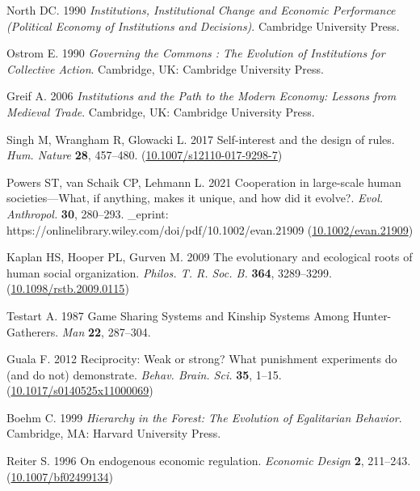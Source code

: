 \documentclass{rstb}
\begin{document}
\begin{thebibliography}{99}

North DC. 1990 {\em Institutions, Institutional Change and Economic Performance
  (Political Economy of Institutions and Decisions)}.
Cambridge University Press.

Ostrom E. 1990 {\em Governing the Commons : {The} Evolution of Institutions for
  Collective Action}.
Cambridge, UK: Cambridge University Press.

Greif A. 2006 {\em Institutions and the Path to the Modern Economy: Lessons
  from Medieval Trade}.
Cambridge, UK: Cambridge University Press.

Singh M, Wrangham R, Glowacki L. 2017  Self-interest and the design of rules.
  {\em Hum. Nature} \textbf{28}, 457--480.
(\href{http://dx.doi.org/10.1007/s12110-017-9298-7}{10.1007/s12110-017-9298-7})

Powers ST, van Schaik CP, Lehmann L. 2021  Cooperation in large-scale human
  societies—{What}, if anything, makes it unique, and how did it evolve?.
  {\em Evol. Anthropol.} \textbf{30},
  280--293.
\_eprint: https://onlinelibrary.wiley.com/doi/pdf/10.1002/evan.21909
  (\href{http://dx.doi.org/10.1002/evan.21909}{10.1002/evan.21909})

Kaplan HS, Hooper PL, Gurven M. 2009  The evolutionary and ecological roots of
  human social organization. {\em Philos. T. R. Soc. B.}
  \textbf{364}, 3289--3299.
(\href{http://dx.doi.org/10.1098/rstb.2009.0115}{10.1098/rstb.2009.0115})

Testart A. 1987  Game Sharing Systems and Kinship Systems Among
  Hunter-Gatherers. {\em Man} \textbf{22}, 287--304.

Guala F. 2012  Reciprocity: Weak or strong? {What} punishment experiments do
  (and do not) demonstrate. {\em Behav. Brain. Sci.} \textbf{35}, 1--15.
(\href{http://dx.doi.org/10.1017/s0140525x11000069}{10.1017/s0140525x11000069})

Boehm C. 1999 {\em Hierarchy in the Forest: {The} Evolution of Egalitarian
  Behavior}.
Cambridge, MA: Harvard University Press.

Reiter S. 1996  On endogenous economic regulation. {\em Economic Design}
  \textbf{2}, 211--243.
(\href{http://dx.doi.org/10.1007/bf02499134}{10.1007/bf02499134})


\end{thebibliography}
\end{document}
